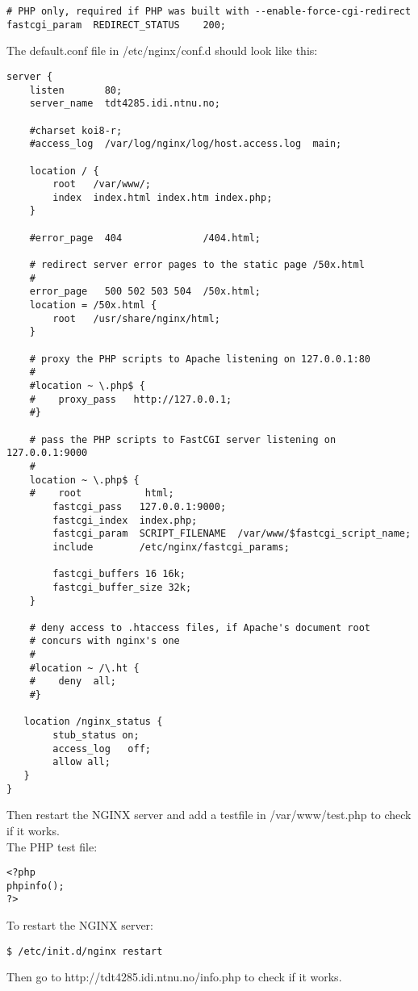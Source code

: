 \begin{itemize}
\begin{lstlisting}
# PHP only, required if PHP was built with --enable-force-cgi-redirect
fastcgi_param  REDIRECT_STATUS    200;
\end{lstlisting}

The default.conf file in /etc/nginx/conf.d should look like this:
\begin{lstlisting}
server {
    listen       80;
    server_name  tdt4285.idi.ntnu.no;

    #charset koi8-r;
    #access_log  /var/log/nginx/log/host.access.log  main;

    location / {
        root   /var/www/;
        index  index.html index.htm index.php;
    }

    #error_page  404              /404.html;

    # redirect server error pages to the static page /50x.html
    #
    error_page   500 502 503 504  /50x.html;
    location = /50x.html {
        root   /usr/share/nginx/html;
    }

    # proxy the PHP scripts to Apache listening on 127.0.0.1:80
    #
    #location ~ \.php$ {
    #    proxy_pass   http://127.0.0.1;
    #}

    # pass the PHP scripts to FastCGI server listening on 127.0.0.1:9000
    #
    location ~ \.php$ {
    #    root           html;
        fastcgi_pass   127.0.0.1:9000;
        fastcgi_index  index.php;
        fastcgi_param  SCRIPT_FILENAME  /var/www/$fastcgi_script_name;
        include        /etc/nginx/fastcgi_params;

        fastcgi_buffers 16 16k;
        fastcgi_buffer_size 32k;
    }

    # deny access to .htaccess files, if Apache's document root
    # concurs with nginx's one
    #
    #location ~ /\.ht {
    #    deny  all;
    #}

   location /nginx_status {
        stub_status on;
        access_log   off;
        allow all;
   }
}
\end{lstlisting}

Then restart the NGINX server and add a testfile in /var/www/test.php to check if it works.\\
The PHP test file:
\lstset{language=PHP}
\begin{lstlisting}
<?php
phpinfo();
?>
\end{lstlisting}

To restart the NGINX server:
\lstset{language=bash}
\begin{lstlisting}
$ /etc/init.d/nginx restart
\end{lstlisting}

Then go to http://tdt4285.idi.ntnu.no/info.php to check if it works. 

\end{itemize}

